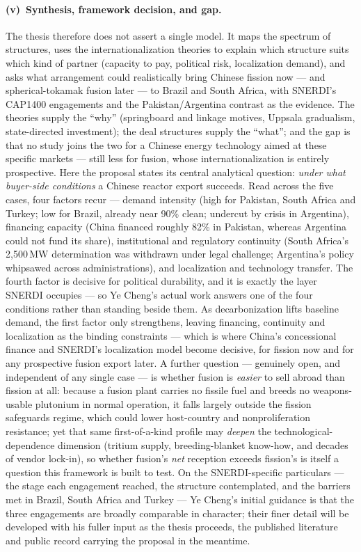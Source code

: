 \documentclass[11pt]{article}
\begin{document}
\paragraph{(v)~Synthesis, framework decision, and gap.}
The thesis therefore does not assert a single model. It maps the spectrum of structures, uses the internationalization theories to explain which structure suits which kind of partner (capacity to pay, political risk, localization demand), and asks what arrangement could realistically bring Chinese fission now --- and spherical-tokamak fusion later --- to Brazil and South Africa, with SNERDI's CAP1400 engagements and the Pakistan/Argentina contrast as the evidence. The theories supply the ``why'' (springboard and linkage motives, Uppsala gradualism, state-directed investment); the deal structures supply the ``what''; and the gap is that no study joins the two for a Chinese energy technology aimed at these specific markets --- still less for fusion, whose internationalization is entirely prospective. Here the proposal states its central analytical question: \emph{under what buyer-side conditions} a Chinese reactor export succeeds. Read across the five cases, four factors recur --- demand intensity (high for Pakistan, South Africa and Turkey; low for Brazil, already near 90\% clean; undercut by crisis in Argentina), financing capacity (China financed roughly 82\% in Pakistan, whereas Argentina could not fund its share), institutional and regulatory continuity (South Africa's 2{,}500\,MW determination was withdrawn under legal challenge; Argentina's policy whipsawed across administrations), and localization and technology transfer. The fourth factor is decisive for political durability, and it is exactly the layer SNERDI occupies --- so Ye Cheng's actual work answers one of the four conditions rather than standing beside them. As decarbonization lifts baseline demand, the first factor only strengthens, leaving financing, continuity and localization as the binding constraints --- which is where China's concessional finance and SNERDI's localization model become decisive, for fission now and for any prospective fusion export later. A further question --- genuinely open, and independent of any single case --- is whether fusion is \emph{easier} to sell abroad than fission at all: because a fusion plant carries no fissile fuel and breeds no weapons-usable plutonium in normal operation, it falls largely outside the fission safeguards regime, which could lower host-country and nonproliferation resistance; yet that same first-of-a-kind profile may \emph{deepen} the technological-dependence dimension (tritium supply, breeding-blanket know-how, and decades of vendor lock-in), so whether fusion's \emph{net} reception exceeds fission's is itself a question this framework is built to test.\cite{fusion_nonprolif} On the SNERDI-specific particulars --- the stage each engagement reached, the structure contemplated, and the barriers met in Brazil, South Africa and Turkey --- Ye Cheng's initial guidance is that the three engagements are broadly comparable in character; their finer detail will be developed with his fuller input as the thesis proceeds, the published literature and public record carrying the proposal in the meantime.
\end{document}
